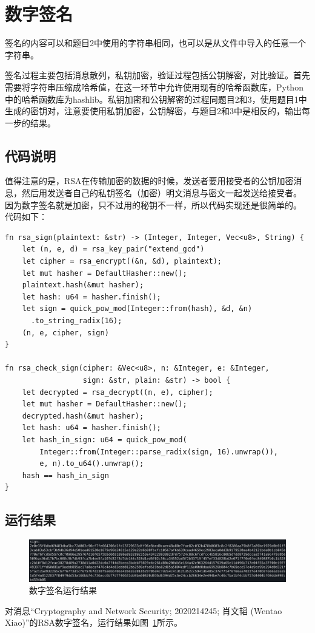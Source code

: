 \documentclass[degree=project,degree-type=project,cjk-font=windows]{thuthesis}
\begin{document}
\section{数字签名}

签名的内容可以和题目2中使用的字符串相同，也可以是从文件中导入的任意一个字符串。

签名过程主要包括消息散列，私钥加密，验证过程包括公钥解密，对比验证。首先需要将字符串压缩成哈希值，在这一环节中允许使用现有的哈希函数库，Python中的哈希函数库为hashlib。私钥加密和公钥解密的过程同题目2和3，使用题目1中生成的密钥对，注意要使用私钥加密，公钥解密，与题目2和3中是相反的，输出每一步的结果。

\subsection{代码说明}

值得注意的是，RSA在传输加密的数据的时候，发送者要用接受者的公钥加密消息，然后用发送者自己的私钥签名（加密）明文消息与密文一起发送给接受者。
因为数字签名就是加密，只不过用的秘钥不一样，所以代码实现还是很简单的。
代码如下：

  \begin{verbatim}
fn rsa_sign(plaintext: &str) -> (Integer, Integer, Vec<u8>, String) {
    let (n, e, d) = rsa_key_pair("extend_gcd")
    let cipher = rsa_encrypt((&n, &d), plaintext);
    let mut hasher = DefaultHasher::new();
    plaintext.hash(&mut hasher);
    let hash: u64 = hasher.finish();
    let sign = quick_pow_mod(Integer::from(hash), &d, &n)
      .to_string_radix(16);
    (n, e, cipher, sign)
}

fn rsa_check_sign(cipher: &Vec<u8>, n: &Integer, e: &Integer,
                  sign: &str, plain: &str) -> bool {
    let decrypted = rsa_decrypt((n, e), cipher);
    let mut hasher = DefaultHasher::new();
    decrypted.hash(&mut hasher);
    let hash: u64 = hasher.finish();
    let hash_in_sign: u64 = quick_pow_mod(
        Integer::from(Integer::parse_radix(sign, 16).unwrap()),
        e, n).to_u64().unwrap();
    hash == hash_in_sign
}
\end{verbatim}

\subsection{运行结果}

\begin{figure}[h]
\centering%
\includegraphics[width=\linewidth]{rsa_t4.png}
  \caption{数字签名运行结果}
  \label{fig:t4}
\end{figure}

对消息“Cryptography and Network Security; 2020214245; 肖文韬 (Wentao Xiao)”的RSA数字签名，运行结果如图~\ref{fig:t4}所示。


\backmatter

\end{document}
